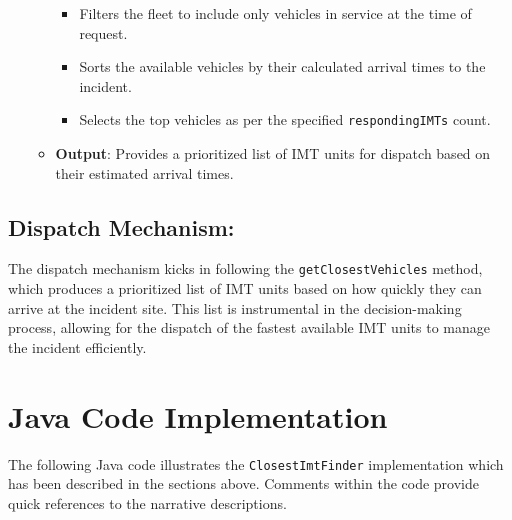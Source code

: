\documentclass[fancy, oneside, mastersfancy, ms]{byuthesis}
\providecommand{\tightlist}{%
  \setlength{\itemsep}{0pt}\setlength{\parskip}{0pt}}\usepackage{longtable,booktabs,array}
\begin{document}
\begin{itemize}
\begin{itemize}
    \begin{itemize}
    \tightlist
    \item
      Filters the fleet to include only vehicles in service at the time
      of request.
    \item
      Sorts the available vehicles by their calculated arrival times to
      the incident.
    \item
      Selects the top vehicles as per the specified
      \texttt{respondingIMTs} count.
    \end{itemize}
  \item
    \textbf{Output}: Provides a prioritized list of IMT units for
    dispatch based on their estimated arrival times.
  \end{itemize}
\end{itemize}

\hypertarget{dispatch-mechanism}{%
\subsection{Dispatch Mechanism:}\label{dispatch-mechanism}}

The dispatch mechanism kicks in following the
\texttt{getClosestVehicles} method, which produces a prioritized list of
IMT units based on how quickly they can arrive at the incident site.
This list is instrumental in the decision-making process, allowing for
the dispatch of the fastest available IMT units to manage the incident
efficiently.

\hypertarget{java-code-implementation}{%
\section{Java Code Implementation}\label{java-code-implementation}}

The following Java code illustrates the \texttt{ClosestImtFinder}
implementation which has been described in the sections above. Comments
within the code provide quick references to the narrative descriptions.
\end{document}
